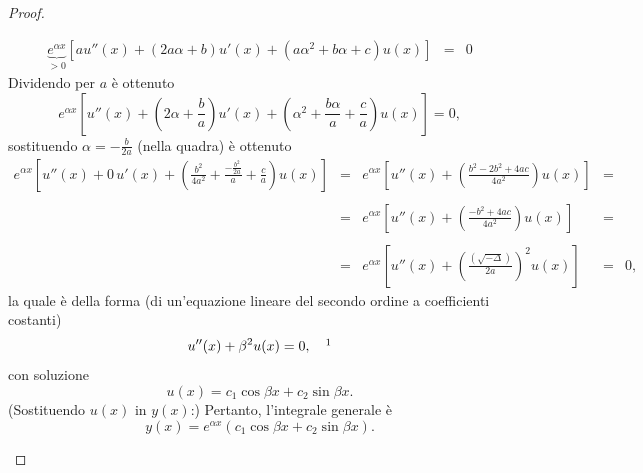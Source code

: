 \begin{proof}
\begin{enumerate}
\begin{equation*}
\begin{matrix}
				\underbrace{e^{\alpha x}}_{>0}[au''(x) + (2a\alpha + b)u'(x)+(a\alpha^2 + b\alpha + c)u(x)] &=& 0
			\end{matrix}
		\end{equation*}
		Dividendo per $a$ è ottenuto
		\begin{equation*}
			e^{\alpha x}\left[u''(x) + \left(2\alpha + \frac{b}{a}\right)u'(x)+\left(\alpha^2 + \frac{b\alpha}{a} + \frac{c}{a}\right)u(x)\right]=0,
		\end{equation*}
		sostituendo $\alpha=-\frac{b}{2a}$ (nella quadra) è ottenuto
		\begin{equation*}
			\begin{matrix}
				e^{\alpha x}\left[u''(x) + 0\, u'(x)+\left(\frac{b^2}{4a^2} + \frac{-\frac{b^2}{2a}}{a}+\frac{c}{a}\right)u(x)\right] &=& e^{\alpha x}\left[u''(x) + \left(\frac{b^2-2b^2+4ac}{4a^2}\right)u(x)\right] &=&\\\\
				&=& e^{\alpha x}\left[u''(x) +\left(\frac{-b^2+4ac}{4a^2}\right)u(x)\right] &=&\\\\
				&=& e^{\alpha x}\left[u''(x) + \left(\frac{(\sqrt{-\Delta})}{2a}\right)^2u(x)\right] &=& 0,
			\end{matrix}
		\end{equation*}
		la quale è della forma (di un'equazione lineare del secondo ordine a coefficienti costanti)
		\begin{equation*}
			u''(x) + \beta^2 u(x) = 0, \quad\footnotemark
		\end{equation*}
		con soluzione
		\begin{equation*}
			u(x) = c_1\cos\beta x + c_2 \sin\beta x.
		\end{equation*}
		\noindent (Sostituendo $u(x)$ in $y(x)$:) Pertanto, l'integrale generale è
		\begin{equation*}
			y(x) = e^{\alpha x}(c_1\cos\beta x + c_2\sin\beta x).
		\end{equation*} 
	\end{enumerate}
\end{proof}


